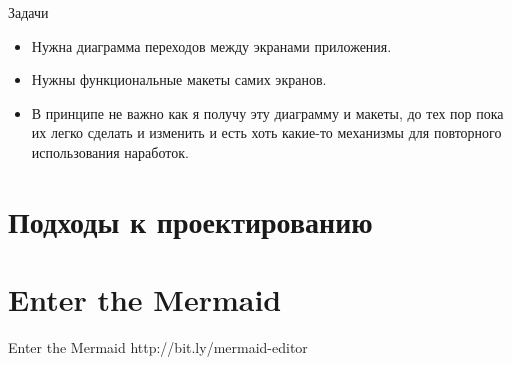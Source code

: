 \documentclass[aspectratio=169,handout,bigger]{beamer}
\begin{document}

\begin{frame}{Задачи}
  \begin{itemize}
    \item Нужна диаграмма переходов между экранами приложения.
    \item Нужны функциональные макеты самих экранов.
    \item В принципе не важно как я получу эту диаграмму и макеты,
          до тех пор пока их легко сделать и изменить
          и есть хоть какие-то механизмы для повторного использования наработок.
  \end{itemize}
\end{frame}

\section{Подходы к проектированию}


\section{Enter the Mermaid}

\begin{frame}{Enter the Mermaid}
  http://bit.ly/mermaid-editor

\end{frame}
\end{document}

